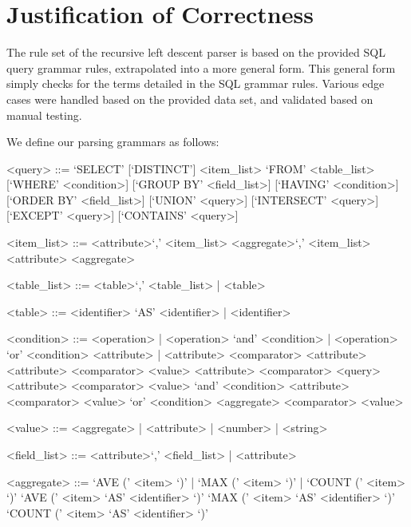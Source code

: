 \documentclass[]{article}
\begin{document}
	\section{Justification of Correctness}\label{grammars}
	
	The rule set of the recursive left descent parser is based on the provided SQL query grammar rules, extrapolated into a more general form. This general form simply checks for the terms detailed in the SQL grammar rules.  Various edge cases were handled based on the provided data set, and validated based on manual testing. 
		
	We define our parsing grammars as follows: \\
	
	\setlength{\grammarparsep}{20pt plus 1pt minus 1pt} %
	\setlength{\grammarindent}{12em} %
	
	\begin{grammar}
		
		<query> ::= `SELECT' [`DISTINCT'] <item\_list> `FROM' <table\_list> [`WHERE' <condition>] [`GROUP BY' <field\_list>] [`HAVING' <condition>] [`ORDER BY' <field\_list>] [`UNION' <query>] [`INTERSECT' <query>] [`EXCEPT' <query>] [`CONTAINS' <query>] 
		
		<item\_list> ::= <attribute>`,' <item\_list>
		\alt <aggregate>`,' <item\_list>
		\alt <attribute>
		\alt <aggregate>
		
		<table\_list> ::= <table>`,' <table\_list> | <table>
		
		<table> ::= <identifier> `AS' <identifier> | <identifier>
		
		<condition> ::= <operation> | <operation> `and' <condition> | <operation> `or' <condition>
		\alt <attribute> | <attribute> <comparator> <attribute>
		\alt <attribute> <comparator> <value>
		\alt <attribute> <comparator> <query>
		\alt <attribute> <comparator> <value> `and' <condition>
		\alt <attribute> <comparator> <value> `or' <condition>
		\alt <aggregate> <comparator> <value>
		
		<value> ::= <aggregate> | <attribute> | <number> | <string>
		
		<field\_list> ::= <attribute>`,' <field\_list> | <attribute>
		
		<aggregate> ::= `AVE (' <item> `)' | `MAX (' <item> `)' | `COUNT (' <item> `)'
		\alt `AVE (' <item> `AS' <identifier> `)'
		\alt `MAX (' <item> `AS' <identifier> `)'
		\alt `COUNT (' <item> `AS' <identifier> `)'
		
	\end{grammar}
	
\end{document}
